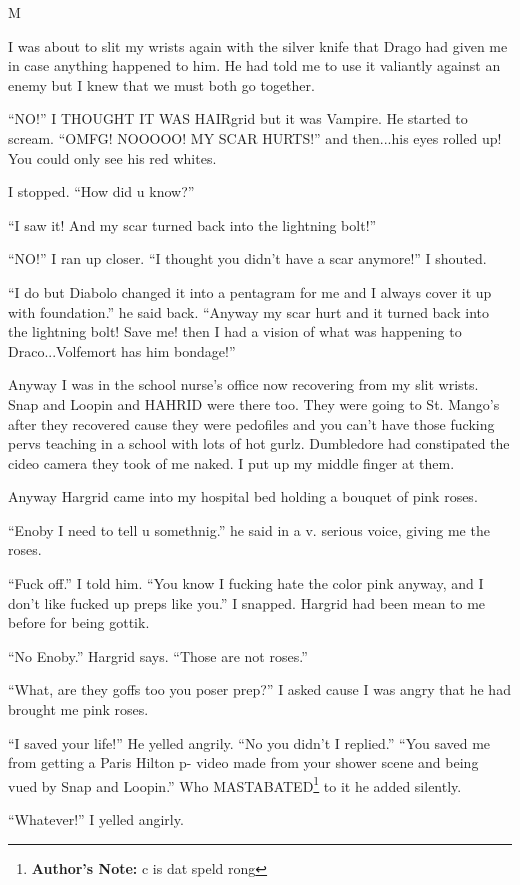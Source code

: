 M\documentclass{article}
\begin{document}
\textbreak
\linenumbers\resetlinenumber

I was about to slit my wrists again with the silver knife that Drago had given me in case anything happened to him. He had told me to use it valiantly against an enemy but I knew that we must both go together.

“NO!” I THOUGHT IT WAS HAIRgrid but it was Vampire. He started to scream. “OMFG! NOOOOO! MY SCAR HURTS!” and then...his eyes rolled up! You could only see his red whites.

I stopped. “How did u know?”

“I saw it! And my scar turned back into the lightning bolt!”

“NO!” I ran up closer. “I thought you didn’t have a scar anymore!” I shouted.

“I do but Diabolo changed it into a pentagram for me and I always cover it up with foundation.” he said back. “Anyway my scar hurt and it turned back into the lightning bolt! Save me! then I had a vision of what was happening to Draco...Volfemort has him bondage!”

Anyway I was in the school nurse’s office now recovering from my slit wrists. Snap and Loopin and HAHRID were there too. They were going to St. Mango’s after they recovered cause they were pedofiles and you can’t have those fucking pervs teaching in a school with lots of hot gurlz. Dumbledore had constipated the cideo camera they took of me naked. I put up my middle finger at them.

Anyway Hargrid came into my hospital bed holding a bouquet of pink roses.

“Enoby I need to tell u somethnig.” he said in a v. serious voice, giving me the roses.

“Fuck off.” I told him. “You know I fucking hate the color pink anyway, and I don’t like fucked up preps like you.” I snapped. Hargrid had been mean to me before for being gottik.

“No Enoby.” Hargrid says. “Those are not roses.”

“What, are they goffs too you poser prep?” I asked cause I was angry that he had brought me pink roses.

“I saved your life!” He yelled angrily. “No you didn’t I replied.” “You saved me from getting a Paris Hilton p- video made from your shower scene and being vued by Snap and Loopin.” Who MASTABATED\footnote{\textbf{Author's Note: }c is dat speld rong} to it he added silently.

“Whatever!” I yelled angirly.
\end{document}
